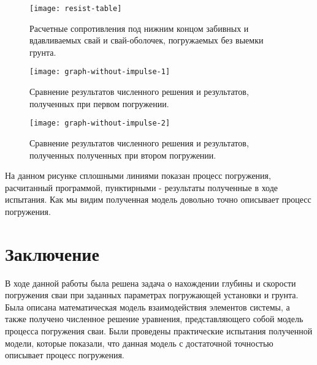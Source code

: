 \begin{figure}[ht]
    \centering
    \texttt{[image: resist-table]}
    \caption{Расчетные сопротивления под нижним концом забивных и вдавливаемых свай и свай-оболочек, погружаемых без выемки грунта.}
    \label{fig:resist-table}
\end{figure}


\begin{figure}[ht]
    \centering
    \texttt{[image: graph-without-impulse-1]}
    \caption{Сравнение результатов численного решения и результатов, полученных при первом погружении.}
    \label{fig:graph-without-impulse-1}
\end{figure}

\begin{figure}[ht]
    \centering
    \texttt{[image: graph-without-impulse-2]}
    \caption{Сравнение результатов численного решения и результатов, полученных полученных при втором погружении.}
    \label{fig:graph-without-impulse-2}
\end{figure}

На данном рисунке сплошными линиями показан процесс погружения, расчитанный программой,
пунктирными - результаты полученные в ходе испытания. Как мы видим полученная модель довольно
точно описывает процесс погружения.

\clearpage

\section*{Заключение}

В ходе данной работы была решена задача о нахождении глубины и скорости погружения сваи при заданных параметрах погружающей
установки и грунта. Была описана математическая модель взаимодействия элементов системы, а также получено численное решение
уравнения, представляющего собой модель процесса погружения сваи. Были проведены практические испытания полученной модели,
которые показали, что данная модель с достаточной точностью описывает процесс погружения.

\clearpage


\nocite{*}

\printbibliography{}